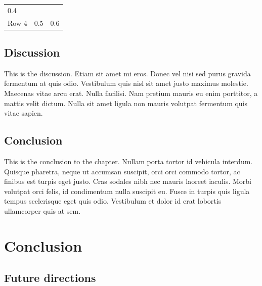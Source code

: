 \documentclass[12pt,a4paperpaper,]{report}
\begin{document}
\begin{longtable}[]{@{}lll@{}}
\begin{minipage}[t]{0.24\columnwidth}\raggedright\strut
0.4
\strut\end{minipage}\tabularnewline
\begin{minipage}[t]{0.25\columnwidth}\raggedright\strut
Row 4
\strut\end{minipage} &
\begin{minipage}[t]{0.30\columnwidth}\raggedright\strut
0.5
\strut\end{minipage} &
\begin{minipage}[t]{0.24\columnwidth}\raggedright\strut
0.6
\strut\end{minipage}\tabularnewline
\bottomrule
\end{longtable}

\section{Discussion}\label{discussion-3}

This is the discussion. Etiam sit amet mi eros. Donec vel nisi sed purus
gravida fermentum at quis odio. Vestibulum quis nisl sit amet justo
maximus molestie. Maecenas vitae arcu erat. Nulla facilisi. Nam pretium
mauris eu enim porttitor, a mattis velit dictum. Nulla sit amet ligula
non mauris volutpat fermentum quis vitae sapien.

\section{Conclusion}\label{conclusion-3}

This is the conclusion to the chapter. Nullam porta tortor id vehicula
interdum. Quisque pharetra, neque ut accumsan suscipit, orci orci
commodo tortor, ac finibus est turpis eget justo. Cras sodales nibh nec
mauris laoreet iaculis. Morbi volutpat orci felis, id condimentum nulla
suscipit eu. Fusce in turpis quis ligula tempus scelerisque eget quis
odio. Vestibulum et dolor id erat lobortis ullamcorper quis at sem.

\chapter{Conclusion}\label{conclusion-4}

\section{Future directions}\label{future-directions}
\end{document}
